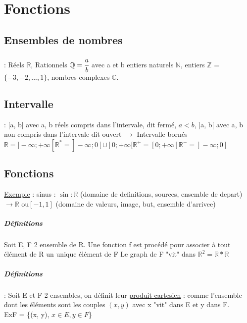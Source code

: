 \chapter{Fonctions}

\section{Ensembles de nombres} : Réels $\mathbb{R}$, Rationnels $\mathbb{Q} = \cfrac{a}{b}$ avec a et b entiers naturels $\mathbb{N}$, entiers $\mathbb{Z}$ = $\{-3, -2, ..., 1\}$, nombres complexes $\mathbb{C}$.
\section{Intervalle} : [a, b] avec a, b réels compris dans l'intervale, dit fermé, $a < b$, ]a, b[ avec a, b non compris dans l'intervale dit ouvert $\rightarrow$ Intervalle bornés
$\mathbb{R} = ]-\infty; +\infty[ \mathbb{R}^* = ]-\infty; 0[ \cup ]0; +\infty[ \mathbb{R}^+ = [0; +\infty[ \mathbb{R}^- = ]-\infty; 0]$

\section{Fonctions}
\ul{Exemple} : sinus : $\sin : \mathbb{R}$ (domaine de definitions, sources, ensemble de depart) $\rightarrow \mathbb{R}$ ou$ [-1, 1]$ (domaine de valeurs, image, but, ensemble d'arrivee)


\paragraph{Définitions} Soit E, F 2 ensemble de R. Une fonction f est procédé pour associer à tout élément de R un unique élément de F
Le graph de F "vit" dans $\mathbb{R}^2 = \mathbb{R}*\mathbb{R}$
\paragraph{Définitions} : Soit E et F 2 ensembles, on définit leur \ul{produit cartesien} :  comme l'ensemble dont les éléments sont les couples $(x, y)$ avec x "vit" dans E et y dans F. ~\\
ExF = \{(x, y), $x \in E, y \in F$\}
